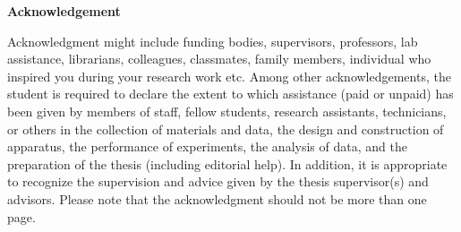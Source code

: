 




\begin{center}
{\LARGE \textbf{Acknowledgement}}
\end{center}


Acknowledgment might include funding bodies, supervisors, professors, lab assistance, librarians, colleagues, classmates, family members, individual who inspired you during your research work etc. Among other acknowledgements, the student is required to declare the extent to which assistance (paid or unpaid) has been given by members of staff, fellow students, research assistants, technicians, or others in the collection of materials and data, the design and construction of apparatus, the performance of experiments, the analysis of data, and the preparation of the thesis (including editorial help). In addition, it is appropriate to recognize the supervision and advice given by the thesis supervisor(s) and advisors. Please note that the acknowledgment should not be more than one page.

\newpage